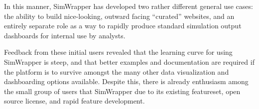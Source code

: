 In this manner, SimWrapper has developed two rather different general use cases: the ability to build nice-looking, outward facing ``curated'' websites, and an entirely separate role as a way to rapidly produce standard simulation output dashboards for internal use by analysts.

Feedback from these initial users revealed that the learning curve for using SimWrapper is steep, and that better examples and documentation are required if the platform is to survive amongst the many other data visualization and dashboarding options available. Despite this, there is already enthusiasm among the small group of users that SimWrapper due to its existing featureset, open source license, and rapid feature development.



